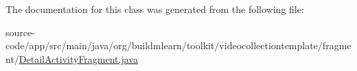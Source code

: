 The documentation for this class was generated from the following file\+:\begin{DoxyCompactItemize}
\item 
source-\/code/app/src/main/java/org/buildmlearn/toolkit/videocollectiontemplate/fragment/\hyperlink{videocollectiontemplate_2fragment_2DetailActivityFragment_8java}{Detail\+Activity\+Fragment.\+java}\end{DoxyCompactItemize}
